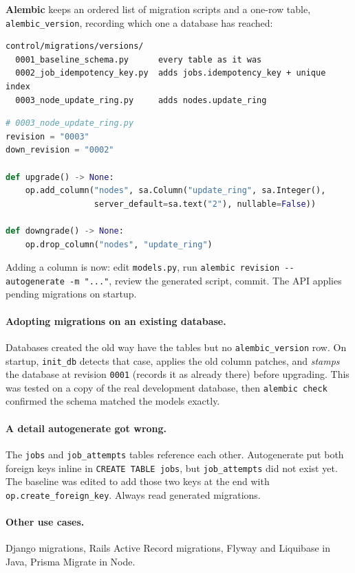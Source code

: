 \textbf{Alembic} keeps an ordered list of migration scripts and a one-row table,
\texttt{alembic\_version}, recording which one a database has reached:

\begin{verbatim}
control/migrations/versions/
  0001_baseline_schema.py      every table as it was
  0002_job_idempotency_key.py  adds jobs.idempotency_key + unique index
  0003_node_update_ring.py     adds nodes.update_ring
\end{verbatim}

\begin{lstlisting}[language=Python]
# 0003_node_update_ring.py
revision = "0003"
down_revision = "0002"

def upgrade() -> None:
    op.add_column("nodes", sa.Column("update_ring", sa.Integer(),
                  server_default=sa.text("2"), nullable=False))

def downgrade() -> None:
    op.drop_column("nodes", "update_ring")
\end{lstlisting}

Adding a column is now: edit \texttt{models.py}, run
\verb|alembic revision --autogenerate -m "..."|, review the generated
script, commit. The API applies pending migrations on startup.

\paragraph{Adopting migrations on an existing database.} Databases created the
old way have the tables but no \texttt{alembic\_version} row. On startup,
\texttt{init\_db} detects that case, applies the old column patches, and
\emph{stamps} the database at revision \texttt{0001} (records it as already
there) before upgrading. This was tested on a copy of the real development
database, then \texttt{alembic check} confirmed the schema matched the models
exactly.

\paragraph{A detail autogenerate got wrong.} The \texttt{jobs} and
\texttt{job\_attempts} tables reference each other. Autogenerate put both
foreign keys inline in \texttt{CREATE TABLE jobs}, but \texttt{job\_attempts}
did not exist yet. The baseline was edited to add those two keys at the end
with \texttt{op.create\_foreign\_key}. Always read generated migrations.

\paragraph{Other use cases.} Django migrations, Rails Active Record migrations,
Flyway and Liquibase in Java, Prisma Migrate in Node.
